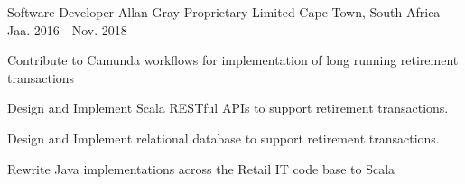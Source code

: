 \begin{cventries}
  \cventry
    {Software Developer} %
    {Allan Gray Proprietary Limited} %
    {Cape Town, South Africa} %
    {Jaa. 2016 - Nov. 2018} %
    {
      \begin{cvitems} %
        \item {Contribute to Camunda workflows for implementation of long running retirement transactions}
        \item {Design and Implement Scala RESTful APIs to support retirement transactions.} 
        \item {Design and Implement relational database to support retirement transactions.} 
        \item {Rewrite Java implementations across the Retail IT code base to Scala}
      \end{cvitems}
    }
\end{cventries}


